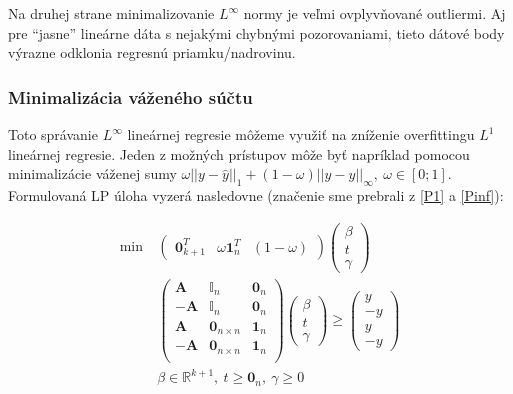\documentclass[report.tex]{subfiles}
\begin{document}
Na druhej strane minimalizovanie $L^{\infty}$ normy je veľmi ovplyvňované outliermi. Aj pre \enquote{jasne} lineárne dáta s nejakými chybnými pozorovaniami, tieto dátové body výrazne odklonia regresnú priamku/nadrovinu. 

\subsubsection{Minimalizácia váženého súčtu}

Toto správanie $L^{\infty}$ lineárnej regresie môžeme využiť na zníženie overfittingu $L^1$ lineárnej regresie. Jeden z možných prístupov môže byť napríklad pomocou minimalizácie váženej sumy $\omega||y - \hat{y}||_1 + (1-\omega)||y - \hat{y}||_{\infty},~\omega \in [0;1]$. Formulovaná LP úloha vyzerá nasledovne (značenie sme prebrali z \eqref{P1} a \eqref{Pinf}):	


\begin{align*}
	\text{min}~ &
	\left(
	\begin{array}{c|c|c}
		\mathbf{0}_{k+1}^T & \omega\mathbf{1}_n^T & (1 - \omega)
	\end{array}
	\right)
	\left(
	\begin{array}{c}
		\beta \\
		\hline
		t \\
		\hline
		\gamma
	\end{array}
	\right) \\
	&\left(
	\begin{array}{c|c|c}
		\mathbf{A} & \mathbb{I}_n & \mathbf{0}_n \\
		\hline
		-\mathbf{A} & \mathbb{I}_n & \mathbf{0}_n \\
		\hline
		\mathbf{A} & \mathbf{0}_{n \times n} & \mathbf{1}_n \\
		\hline
		-\mathbf{A} & \mathbf{0}_{n \times n} & \mathbf{1}_n \\
	\end{array}
	\right)
	\left(
	\begin{array}{c}
		\beta \\
		\hline
		t \\
		\hline
		\gamma
	\end{array}
	\right)
	\geq
	\left(
	\begin{array}{c}
		y \\
		\hline
		-y \\
		\hline
		y \\
		\hline
		-y
	\end{array}
	\right) \\
	&\beta \in \mathbb{R}^{k+1},~t \geq \mathbf{0}_{n},~\gamma \geq 0
\end{align*}
\end{document}
